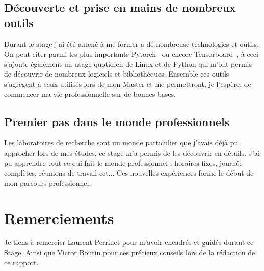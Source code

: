 \documentclass[11pt,francais]{article}
\begin{document}
\subsection{Découverte et prise en mains de nombreux outils}
Durant le stage j'ai été amené à me former a de nombreuse technologies et outils. On peut citer parmi les plus importants Pytorch~\cite{paszke2017automatic} ou encore Tensorboard~\cite{tensorflow2015-whitepaper}, à ceci s'ajoute également un usage quotidien de Linux et de Python qui m'ont permis de découvrir de nombreux logiciels et bibliothèques. Ensemble ces outils s'agrègent à ceux utilisés lors de mon Master et me permettront, je l'espère, de commencer ma vie professionnelle sur de bonnes bases.

\subsection{Premier pas dans le monde professionnels}
Les laboratoires de recherche sont un monde particulier que j'avais déjà pu approcher lors de mes études, ce stage m'a permis de les découvrir en détails. J'ai pu apprendre tout ce qui fait le monde professionnel : horaires fixes, journée complètes, réunions de travail ect... 
Ces nouvelles expériences forme le début de mon parcours professionnel.

\newpage


\section*{Remerciements}
Je tiens à remercier Laurent Perrinet pour m'avoir encadrés et guidés durant ce Stage.
Ainsi que Victor Boutin pour ces précieux conseils lors de la rédaction de ce rapport.



\newpage
\end{document}
